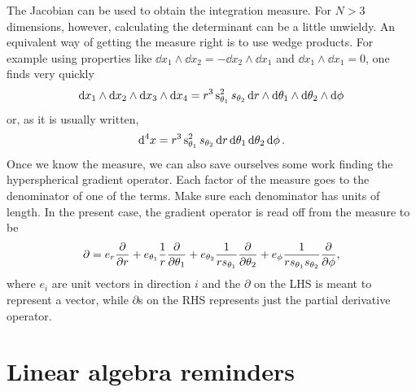 The Jacobian can be used to obtain the integration measure. For $N>3$
dimensions, however, calculating the determinant can be a little
unwieldy. An equivalent way of getting the measure right is to
use wedge products. For example using properties like
$\dd{x_1}\wedge\dd{x_2}=-\dd{x_2}
  \wedge\dd{x_1}$ and $\dd{x_1}\wedge\dd{x_1}=0$, 
one finds very quickly
\begin{equation}
  \dd{x_1}\wedge\dd{x_2}\wedge\dd{x_3}\wedge\dd{x_4}
   =r^3\operatorname{s}_{\theta_1}^2s_{\theta_2} 
     \dd{r}\wedge\dd{\theta_1}\wedge\dd{\theta_2}\wedge\dd{\phi}
\end{equation}
or, as it is usually written,
\begin{equation}
  \dd[4]{x}=r^3\operatorname{s}_{\theta_1}^2s_{\theta_2}
             \dd{r}\dd{\theta_1}\dd{\theta_2}\dd{\phi}.
\end{equation}
Once we know the measure, we can also save ourselves some work
finding the hyperspherical gradient operator. Each factor of the
measure goes to the denominator of one of the terms. Make sure
each denominator has units of length. In the present case, the
gradient operator is read off from the measure to be
\begin{equation}\label{eq:4dgrad}
  \partial=e_r\frac{\partial}{\partial r}
   +e_{\theta_1}\frac{1}{r}\frac{\partial}{\partial\theta_1}
   +e_{\theta_2}\frac{1}{rs_{\theta_1}}\frac{\partial}{\partial\theta_2}
   +e_\phi\frac{1}{rs_{\theta_1}s_{\theta_2}}\frac{\partial}{\partial\phi},
\end{equation}
where $e_i$ are unit vectors in direction $i$ and the $\partial$ on
the LHS is meant to represent a vector, while $\partial$s on the RHS
represents just the partial derivative operator.

\section{Linear algebra reminders}

